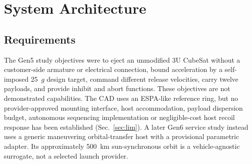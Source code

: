 \documentclass[conference]{IEEEtran}
\begin{document}
\section{System Architecture}
\subsection{Requirements}
The Gen5 study objectives were to eject an unmodified 3U CubeSat without a customer-side armature or electrical connection, bound acceleration by a self-imposed 25~$g$ design target, command different release velocities, carry twelve payloads, and provide inhibit and abort functions. These objectives are not demonstrated capabilities. The CAD uses an ESPA-like reference ring, but no provider-approved mounting interface, host accommodation, payload dispersion budget, autonomous sequencing implementation or negligible-cost host recoil response has been established (Sec.~\ref{sec:lim}). A later Gen6 service study instead uses a generic maneuvering orbital-transfer host with a provisional parametric adapter. Its approximately 500~km sun-synchronous orbit is a vehicle-agnostic surrogate, not a selected launch provider.
\end{document}
